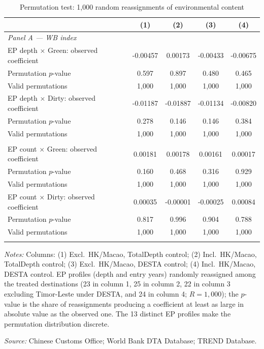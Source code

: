 \begin{table}[htbp]
\centering
\footnotesize
\caption{Permutation test: 1,000 random reassignments of environmental content}
\label{tab:perm}
\begin{threeparttable}
\begin{tabular}{lcccc}
\toprule
 & (1) & (2) & (3) & (4) \\
\midrule
\multicolumn{5}{l}{\textit{Panel A --- WB index}} \\
\addlinespace
EP depth $\times$ Green: observed coefficient & -0.00457 & 0.00173 & -0.00433 & -0.00675 \\
\quad Permutation $p$-value & 0.597 & 0.897 & 0.480 & 0.465 \\
\quad Valid permutations & 1,000 & 1,000 & 1,000 & 1,000 \\
\addlinespace
EP depth $\times$ Dirty: observed coefficient & -0.01187 & -0.01887 & -0.01134 & -0.00820 \\
\quad Permutation $p$-value & 0.278 & 0.146 & 0.146 & 0.384 \\
\quad Valid permutations & 1,000 & 1,000 & 1,000 & 1,000 \\
\addlinespace
\multicolumn{5}{l}{\textit{Panel B --- TREND index}} \\
\addlinespace
EP count $\times$ Green: observed coefficient & 0.00181 & 0.00178 & 0.00161 & 0.00017 \\
\quad Permutation $p$-value & 0.160 & 0.468 & 0.316 & 0.929 \\
\quad Valid permutations & 1,000 & 1,000 & 1,000 & 1,000 \\
\addlinespace
EP count $\times$ Dirty: observed coefficient & 0.00035 & -0.00001 & -0.00025 & 0.00084 \\
\quad Permutation $p$-value & 0.817 & 0.996 & 0.904 & 0.788 \\
\quad Valid permutations & 1,000 & 1,000 & 1,000 & 1,000 \\
\addlinespace
\bottomrule
\end{tabular}
\begin{tablenotes}[flushleft]\footnotesize
\item \emph{Notes:} Columns: (1) Excl.\ HK/Macao, TotalDepth control; (2) Incl.\ HK/Macao, TotalDepth control; (3) Excl.\ HK/Macao, DESTA control; (4) Incl.\ HK/Macao, DESTA control. EP profiles (depth and entry years) randomly reassigned among the treated destinations (23 in column 1, 25 in column 2, 22 in column 3 excluding Timor-Leste under DESTA, and 24 in column 4; $R = 1{,}000$); the $p$-value is the share of reassignments producing a coefficient at least as large in absolute value as the observed one. The 13 distinct EP profiles make the permutation distribution discrete.
\item \textit{Source:} Chinese Customs Office; World Bank DTA Database; TREND Database.
\end{tablenotes}
\end{threeparttable}
\end{table}
